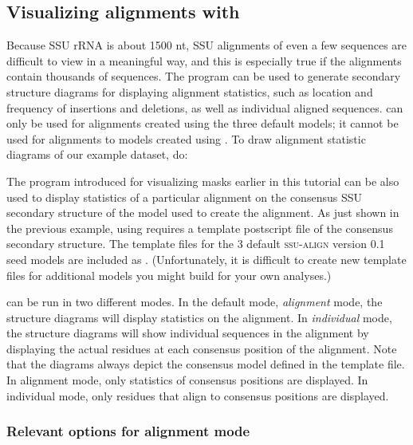 \subsection{Visualizing alignments with }

Because SSU rRNA is about 1500 nt, SSU alignments of even a few
sequences are difficult to view in a meaningful way, and this is
especially true if the alignments contain thousands of sequences.
The  program can be used to generate secondary
structure diagrams for displaying alignment statistics, such as
location and frequency of insertions and deletions, as well as
individual aligned sequences.  can only be used for
alignments created using the three default models; it cannot
be used for alignments to models created using .
To draw alignment statistic diagrams of our  example
dataset, do:





The  program introduced for visualizing masks
earlier in this tutorial can be also used to display statistics of
a particular alignment on the consensus SSU secondary structure of the
model used to create the alignment. As just shown in the previous example,
using  requires a template postscript file of the
consensus secondary structure. The template files for the 3 default
\textsc{ssu-align} version 0.1 seed models are included as
. 
(Unfortunately, it is difficult to create new template files for
additional models you might build for your own analyses.) 

 can be run in two different modes. In the default
mode, \emph{alignment} mode, the structure diagrams will display
statistics on the alignment. In \emph{individual} mode, the structure
diagrams will show individual sequences in the alignment by displaying
the actual residues at each consensus position of the alignment. Note
that the diagrams always depict the consensus model defined in the
template file. In alignment mode, only statistics of consensus
positions are displayed. In individual mode, only residues that align to
consensus positions are displayed.

\subsubsection{Relevant options for alignment mode}

